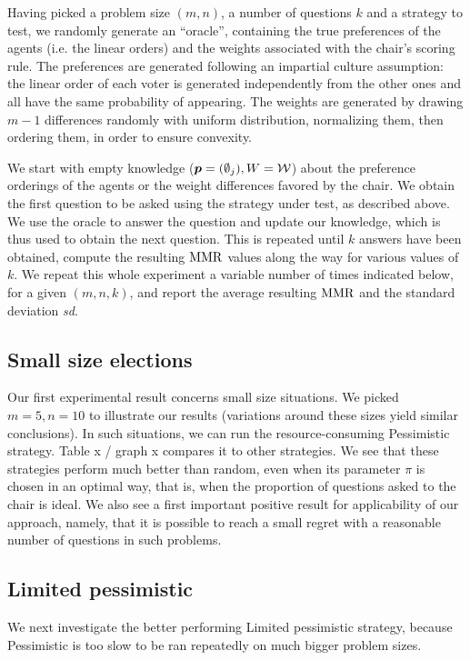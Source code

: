 \documentclass[sigconf, anonymous]{aamas}
\begin{document}
Having picked a problem size $(m, n)$, a number of questions $k$ and a strategy to test, we randomly generate an “oracle”, containing the true preferences of the agents (i.e. the linear orders) and the weights associated with the chair's scoring rule. 
The preferences are generated following an impartial culture assumption: the linear order of each voter is generated independently from the other ones and all have the same probability of appearing. The weights are generated by drawing $m-1$ differences randomly with uniform distribution, normalizing them, then ordering them, in order to ensure convexity.

We start with empty knowledge (${\bm{p}} = (\emptyset_j), W = \mathcal{W}$) about the preference orderings of the agents or the weight differences favored by the chair. We obtain the first question to be asked using the strategy under test, as described above. We use the oracle to answer the question and update our knowledge, which is thus used to obtain the next question. This is repeated until $k$ answers have been obtained, compute the resulting $\operatorname{MMR}$ values along the way for various values of $k$. We repeat this whole experiment a variable number of times indicated below, for a given $(m, n, k)$, and report the average resulting $\operatorname{MMR}$ and the standard deviation \textit{sd}.

\subsection{Small size elections}
Our first experimental result concerns small size situations. We picked $m = 5, n = 10$ to illustrate our results (variations around these sizes yield similar conclusions). In such situations, we can run the resource-consuming Pessimistic strategy. Table x / graph x compares it to other strategies. We see that these strategies perform much better than random, even when its parameter $\pi$ is chosen in an optimal way, that is, when the proportion of questions asked to the chair is ideal. We also see a first important positive result for applicability of our approach, namely, that it is possible to reach a small regret with a reasonable number of questions in such problems. 

\subsection{Limited pessimistic}
We next investigate the better performing Limited pessimistic strategy, because Pessimistic is too slow to be ran repeatedly on much bigger problem sizes.
\end{document}
